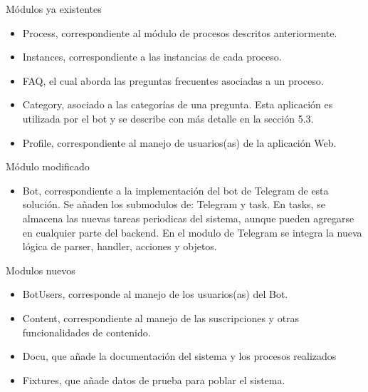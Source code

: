    Módulos ya existentes
    \begin{itemize}
        \item Process, correspondiente al módulo de procesos descritos anteriormente.
        \item Instances, correspondiente a las instancias de cada proceso.
        \item FAQ, el cual aborda las preguntas frecuentes asociadas a un proceso.
        \item Category, asociado a las categorías de una pregunta. Esta aplicación es utilizada por el bot y se describe con más detalle en la sección 5.3.
        \item Profile, correspondiente al manejo de usuarios(as) de la aplicación Web.  
    \end{itemize}

    Módulo modificado
    \begin{itemize}
        \item Bot, correspondiente a la implementación del bot de Telegram de esta solución. Se añaden los submodulos de: Telegram y task. En tasks, se almacena las nuevas tareas periodicas del sistema, aunque pueden agregarse en cualquier parte del backend. En el modulo de Telegram se integra la nueva lógica de parser, handler, acciones y objetos.
    \end{itemize}
    
    Modulos nuevos
    \begin{itemize}
        \item BotUsers, corresponde al manejo de los usuarios(as) del Bot.
        \item Content, correspondiente al manejo de las suscripciones y otras funcionalidades de contenido.
        \item Docu, que añade la documentación del sistema y los procesos realizados
        \item Fixtures, que añade datos de prueba para poblar el sistema.
    \end{itemize}

